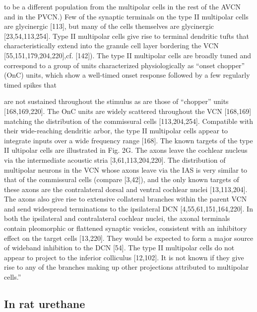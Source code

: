\documentclass[10pt,a4paper]{article}
\begin{document}
to be a different population from the multipolar cells in the rest of the AVCN
and in the PVCN.) Few of the synaptic terminals on the type II multipolar cells
are glycinergic [113], but many of the cells themselves are glycinergic
[23,54,113,254]. Type II multipolar cells give rise to terminal dendritic tufts
that characteristically extend into the granule cell layer bordering the VCN
[55,151,179,204,220],cf.  [142]). The type II multipolar cells are broadly tuned
and correspond to a group of units characterized physiologically as
{\textquotedblleft}onset chopper{\textquotedblright} (OnC) units, which show a
well-timed onset response followed by a few regularly timed spikes that

are not sustained throughout the stimulus as are those of
{\textquotedblleft}chopper{\textquotedblright} units [168,169,220]. The OnC
units are widely scattered throughout the VCN [168,169] matching the
distribution of the commissural cells [113,204,254]. Compatible with their
wide-reaching dendritic arbor, the type II multipolar cells appear to integrate
inputs over a wide frequency range [168]. The known targets of the type II
ultipolar cells are illustrated in Fig. 2G. The axons leave the cochlear nucleus
via the intermediate acoustic stria [3,61,113,204,220]. The distribution of
multipolar neurons in the VCN whose axons leave via the IAS is very similar to
that of the commissural cells (compare [3,42]), and the only known targets of
these axons are the contralateral dorsal and ventral cochlear nuclei
[13,113,204]. The axons also give rise to extensive collateral branches within
the parent VCN and send widespread terminations to the ipsilateral DCN
[4,55,61,151,164,220]. In both the ipsilateral and contralateral cochlear
nuclei, the axonal terminals contain pleomorphic or flattened synaptic vesicles,
consistent with an inhibitory effect on the target cells [13,220]. They would be
expected to form a major source of wideband inhibition to the DCN [54]. The type
II multipolar cells do not appear to project to the inferior colliculus
[12,102]. It is not known if they give rise to any of the branches making up
other projections attributed to multipolar cells.{\textquotedblright}


\citep{BrewForsythe:1995}

\subsection{In rat urethane \citep{PaoliniClark:1999}}
\end{document}
